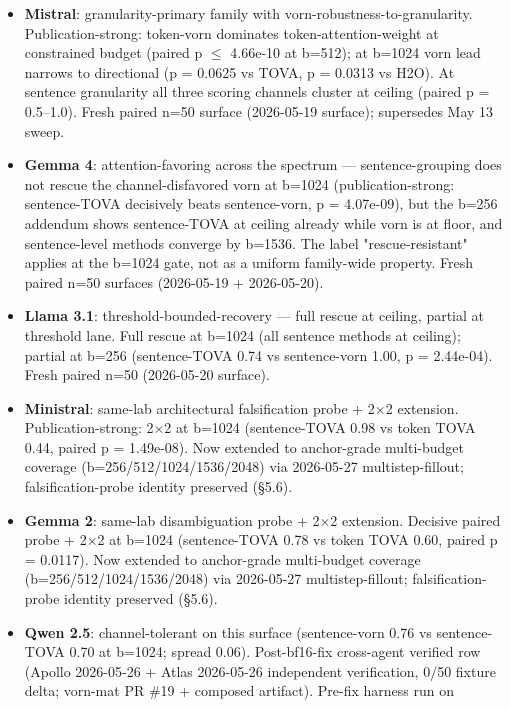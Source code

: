 \documentclass[
]{article}
\providecommand{\tightlist}{%
  \setlength{\itemsep}{0pt}\setlength{\parskip}{0pt}}
\begin{document}
\begin{itemize}
\tightlist
\item
  \textbf{Mistral}: granularity-primary family with
  vorn-robustness-to-granularity. Publication-strong: token-vorn
  dominates token-attention-weight at constrained budget (paired p $\le$
  4.66e-10 at b=512); at b=1024 vorn lead narrows to directional (p =
  0.0625 vs TOVA, p = 0.0313 vs H2O). At sentence
  granularity all three scoring channels cluster at ceiling (paired p =
  0.5--1.0). Fresh paired n=50 surface (2026-05-19 surface); supersedes
  May 13 sweep.
\item
  \textbf{Gemma 4}: attention-favoring across the spectrum ---
  sentence-grouping does not rescue the channel-disfavored vorn at
  b=1024 (publication-strong: sentence-TOVA
  decisively beats sentence-vorn, p = 4.07e-09), but the b=256
  addendum shows sentence-TOVA at ceiling already while vorn is
  at floor, and sentence-level methods converge by b=1536. The label
  "rescue-resistant" applies at the b=1024 gate, not as a uniform
  family-wide property. Fresh paired n=50 surfaces (2026-05-19 +
  2026-05-20).
\item
  \textbf{Llama 3.1}: threshold-bounded-recovery --- full rescue at
  ceiling, partial at threshold lane. Full rescue at b=1024 (all
  sentence methods at ceiling); partial at b=256 (sentence-TOVA 0.74 vs
  sentence-vorn 1.00, p = 2.44e-04). Fresh paired n=50 (2026-05-20
  surface).
\item
  \textbf{Ministral}: same-lab architectural falsification probe + 2×2
  extension. Publication-strong: 2×2 at b=1024 (sentence-TOVA 0.98 vs
  token TOVA 0.44, paired p = 1.49e-08). Now extended to anchor-grade
  multi-budget coverage (b=256/512/1024/1536/2048) via 2026-05-27
  multistep-fillout; falsification-probe identity preserved (§5.6).
\item
  \textbf{Gemma 2}: same-lab disambiguation probe + 2×2 extension.
  Decisive paired probe + 2×2 at b=1024 (sentence-TOVA 0.78 vs token
  TOVA 0.60, paired p = 0.0117). Now extended to anchor-grade
  multi-budget coverage (b=256/512/1024/1536/2048) via 2026-05-27
  multistep-fillout; falsification-probe identity preserved (§5.6).
\item
  \textbf{Qwen 2.5}: channel-tolerant on this surface
  (sentence-vorn 0.76 vs sentence-TOVA 0.70 at b=1024; spread 0.06).
  Post-bf16-fix cross-agent verified row (Apollo 2026-05-26 +
  Atlas 2026-05-26 independent verification, 0/50 fixture delta;
  vorn-mat PR \#19 + composed artifact). Pre-fix harness run on

\end{itemize}
\end{document}
